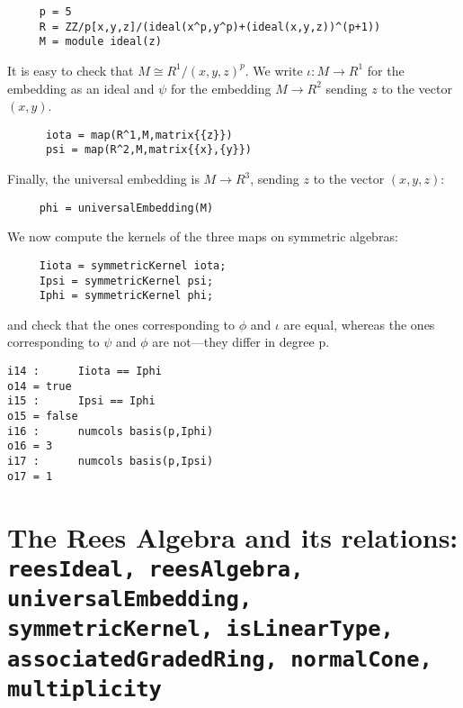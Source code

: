 \documentclass[twoside,12pt, leqno]{amsart}
\begin{document}
\begin{footnotesize}
  \begin{verbatim}
     p = 5
     R = ZZ/p[x,y,z]/(ideal(x^p,y^p)+(ideal(x,y,z))^(p+1))
     M = module ideal(z) 
 \end{verbatim}
\begin{normalsize}
    It is easy to check that $M \cong R^1/(x,y,z)^p$.
     We write $\iota: M\to R^1$ for the embedding as an ideal
     and $\psi$ for the embedding $M \to R^2$ sending $z$ to the vector $(x,y)$.
\end{normalsize}
 \begin{verbatim}
      iota = map(R^1,M,matrix{{z}}) 
      psi = map(R^2,M,matrix{{x},{y}})
\end{verbatim}
\begin{normalsize}
      Finally, the universal embedding is $M \to R^3$,
     sending $z$ to the vector $(x,y,z)$:
\end{normalsize}
\begin{verbatim}
     phi = universalEmbedding(M)
\end{verbatim}
\begin{normalsize}
     We now compute the kernels of the three maps
     on symmetric algebras:
\end{normalsize}
 \begin{verbatim}
     Iiota = symmetricKernel iota;
     Ipsi = symmetricKernel psi;
     Iphi = symmetricKernel phi;
\end{verbatim}
\begin{normalsize}
      and check that the ones corresponding to $\phi$ and $\iota$
     are equal, whereas the ones corresponding to $\psi$ and $\phi$
     are not---they differ in degree p.
\end{normalsize}
 \begin{verbatim}
i14 :      Iiota == Iphi    
o14 = true
i15 :      Ipsi == Iphi
o15 = false
i16 :      numcols basis(p,Iphi) 
o16 = 3
i17 :      numcols basis(p,Ipsi)
o17 = 1
\end{verbatim}
\end{footnotesize}


\section{The Rees Algebra and its relations:\\ {\tt reesIdeal, reesAlgebra, universalEmbedding, symmetricKernel, isLinearType,
associatedGradedRing, normalCone, multiplicity}}
\end{document}
